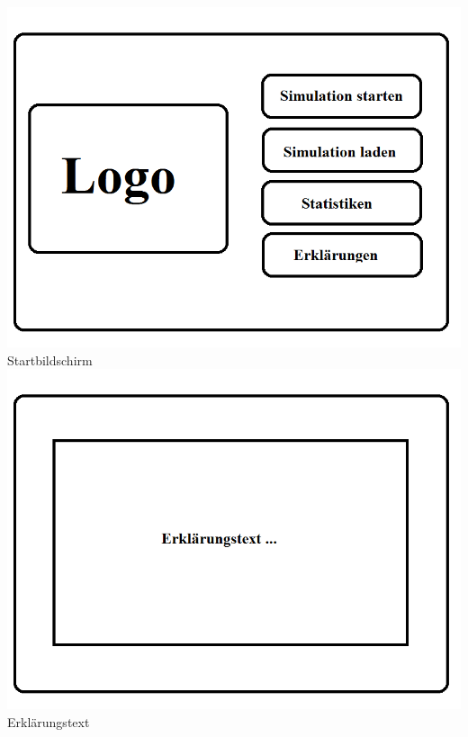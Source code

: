 \documentclass[a4paper, 10pt]{article}
\begin{document}
\begin{minipage}{49mm} 
\includegraphics[scale=0.45]{Bilder/Startbildschirm.png}
Startbildschirm
\includegraphics[scale=0.45]{Bilder/Erklarungstext.png}
Erklärungstext
\end{minipage}
\end{document}
